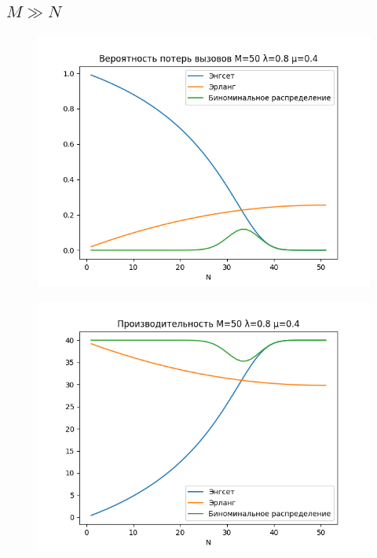 \documentclass[12pt]{article}
\let\Oldsubsection\subsection
\renewcommand{\subsection}{\FloatBarrier\Oldsubsection}
\begin{document}
\subsection{$M ≫ N$}
\begin{figure}[!htb]
\centering
\includegraphics[scale=1.00]{assets/iss_4/loss_prob_M50_lam08_mu04.png}
\caption{}
\label{}
\end{figure}

\begin{figure}[!htb]
\centering
\includegraphics[scale=1.00]{assets/iss_4/perf_M50_lam08_mu04.png}
\caption{}
\label{}
\end{figure}
\end{document}
